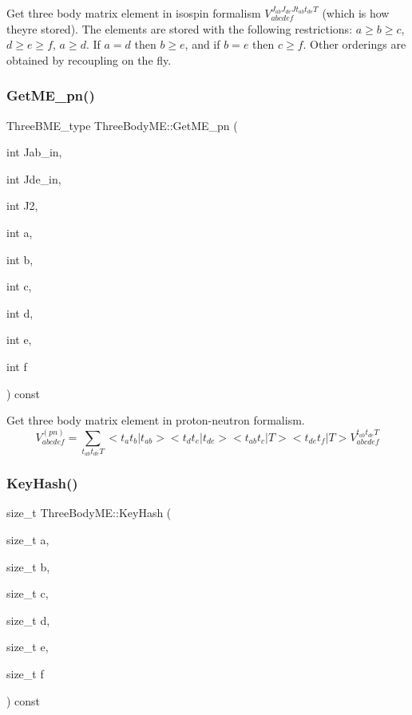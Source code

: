 Get three body matrix element in isospin formalism $ V_{abcdef}^{J_{ab}J_{de}Jt_{ab}t_{de}T} $ (which is how they\textquotesingle{}re stored). The elements are stored with the following restrictions\+: $ a\geq b \geq c$, $ d\geq e \geq f$, $ a\geq d$. If $ a=d$ then $ b \geq e$, and if $ b=e $ then $ c \geq f $. Other orderings are obtained by recoupling on the fly. \mbox{\label{classThreeBodyME_a366e6d2a60c1ec6187b57e80b9efc5e3}} 
\subsubsection{\texorpdfstring{Get\+M\+E\+\_\+pn()}{GetME\_pn()}}
{\footnotesize\ttfamily Three\+B\+M\+E\+\_\+type Three\+Body\+M\+E\+::\+Get\+M\+E\+\_\+pn (\begin{DoxyParamCaption}\item[{int}]{Jab\+\_\+in,  }\item[{int}]{Jde\+\_\+in,  }\item[{int}]{J2,  }\item[{int}]{a,  }\item[{int}]{b,  }\item[{int}]{c,  }\item[{int}]{d,  }\item[{int}]{e,  }\item[{int}]{f }\end{DoxyParamCaption}) const}

Get three body matrix element in proton-\/neutron formalism. \[ V_{abcdef}^{(pn)} = \sum_{t_{ab} t_{de} T} <t_a t_b | t_{ab}> <t_d t_e | t_{de}> <t_{ab} t_c | T> <t_{de} t_f| T> V_{abcdef}^{t_{ab} t_{de} T} \] \mbox{\label{classThreeBodyME_a2e6c6bd8f5e5b4b07b74e6c643039cf7}} 
\subsubsection{\texorpdfstring{Key\+Hash()}{KeyHash()}}
{\footnotesize\ttfamily size\+\_\+t Three\+Body\+M\+E\+::\+Key\+Hash (\begin{DoxyParamCaption}\item[{size\+\_\+t}]{a,  }\item[{size\+\_\+t}]{b,  }\item[{size\+\_\+t}]{c,  }\item[{size\+\_\+t}]{d,  }\item[{size\+\_\+t}]{e,  }\item[{size\+\_\+t}]{f }\end{DoxyParamCaption}) const}

